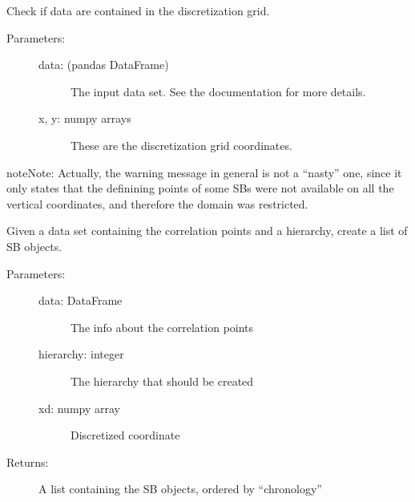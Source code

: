 \documentclass[letterpaper,10pt,english]{sphinxmanual}
\begin{document}
\begin{fulllineitems}
\label{\detokenize{hiegeo:hiegeo.check_data_ingrid}}
Check if data are contained in the discretization grid.
\begin{description}
\item[{Parameters:}] \leavevmode\begin{description}
\item[{data: (pandas DataFrame)}] \leavevmode
The input data set. See the documentation for more details.

\item[{x, y: numpy arrays}] \leavevmode
These are the discretization grid coordinates.

\end{description}

\end{description}

\begin{sphinxadmonition}{note}{Note:}
Actually, the warning message in general is not a “nasty” one, since it only
states that the definining points of some SBs were not available on all the
vertical coordinates, and therefore the domain was restricted.
\end{sphinxadmonition}

\end{fulllineitems}


\begin{fulllineitems}
\label{\detokenize{hiegeo:hiegeo.create_sb_by_hierarchy}}
Given a data set containing the correlation points and a hierarchy,
create a list of SB objects.
\begin{description}
\item[{Parameters:}] \leavevmode\begin{description}
\item[{data: DataFrame}] \leavevmode
The info about the correlation points

\item[{hierarchy: integer}] \leavevmode
The hierarchy that should be created

\item[{xd: numpy array}] \leavevmode
Discretized  coordinate

\end{description}

\item[{Returns:}] \leavevmode
A list containing the SB objects, ordered by “chronology”

\end{description}

\end{fulllineitems}
\end{document}
